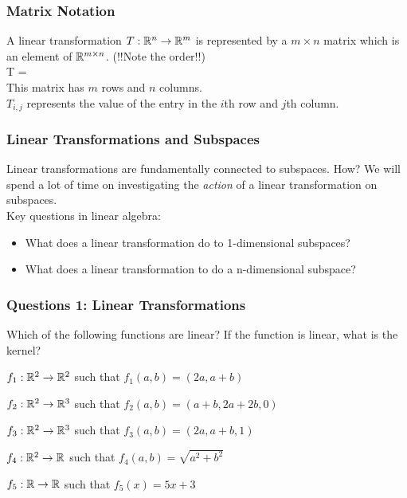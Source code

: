 \documentclass[table]{beamer}
\renewenvironment{enumerate}%
{\begin{list}{\arabic{enumi}.}%
      {\setlength{\leftmargin}{2.5em}%
       \setlength{\itemsep}{-\parsep}%
       \setlength{\topsep}{-\parskip}%
       \usecounter{enumi}}%
 }{\end{list}}
\begin{document}

\begin{frame}
\frametitle{Matrix Notation}
A linear transformation $ T: \mathbb{R}^n \to \mathbb{R}^m$ is represented by a $m \times n $ matrix
which is an element of $\mathbb{R}^{m\times n}$. (!!Note the order!!)\\
T = 
\\
\bigskip
This matrix has $m$ rows and $n$ columns. \\
$T_{i,j}$ represents the value of the entry in the $i$th row and $j$th column.
\end{frame}


\begin{frame}
\frametitle{Linear Transformations and Subspaces}
Linear transformations are fundamentally connected to subspaces. How?
We will spend a lot of time on investigating the \textit{action} of a linear transformation 
on subspaces.\\
\medskip
Key questions in linear algebra: 
\begin{itemize}
\item What does a linear transformation do to 1-dimensional subspaces?
\item What does a linear transformation to do a n-dimensional subspace?
\end{itemize}

\end{frame}


\begin{frame}
\frametitle{Questions 1: Linear Transformations}
Which of the following functions are linear?  If the function is
linear, what is the kernel?
  \begin{enumerate}
  \item $f_1:\mathbb{R}^2\to\mathbb{R}^2$ such that $f_1(a,b) = (2a,a+b)$
  \item $f_2:\mathbb{R}^2\to\mathbb{R}^3$ such that $f_2(a,b) = (a+b,2a+2b,0)$
  \item $f_3:\mathbb{R}^2\to\mathbb{R}^3$ such that $f_3(a,b) = (2a,a+b,1)$
  \item $f_4:\mathbb{R}^2\to\mathbb{R}$ such that $f_4(a,b) = \sqrt{a^2+b^2}$
  \item $f_5:\mathbb{R}\to\mathbb{R}$ such that $f_5(x) = 5x+3$
  \end{enumerate}
\end{frame}
\end{document}
